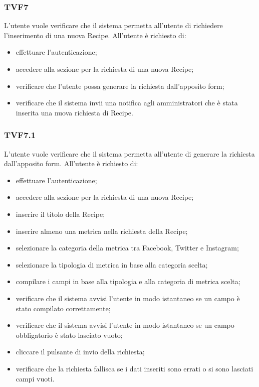 		\subsubsection{TVF7}
			L'utente vuole verificare che il sistema permetta all'utente di richiedere l'inserimento di una nuova Recipe. All'utente è richiesto di:
			\begin{itemize}
				\item effettuare l'autenticazione;
				\item accedere alla sezione per la richiesta di una nuova Recipe;
				\item verificare che l'utente possa generare la richiesta dall'apposito form;
				\item verificare che il sistema invii una notifica agli amministratori che è stata inserita  una nuova richiesta di Recipe.
			\end{itemize}
			
		\subsubsection{TVF7.1}
			L'utente vuole verificare che il sistema permetta all'utente di generare la richiesta dall'apposito form. All'utente è richiesto di:
			\begin{itemize}
				\item effettuare l'autenticazione;
				\item accedere alla sezione per la richiesta di una nuova Recipe;
				\item inserire il titolo della Recipe;
				\item inserire almeno una metrica nella richiesta della Recipe;
				\item selezionare la categoria della metrica tra Facebook, Twitter e Instagram;
				\item selezionare la tipologia di metrica in base alla categoria scelta;
				\item compilare i campi in base alla tipologia e alla categoria di metrica scelta;
				\item verificare che il sistema avvisi l'utente in modo istantaneo se un campo è stato compilato correttamente;
				\item verificare che il sistema avvisi l'utente in modo istantaneo se un campo obbligatorio è stato lasciato vuoto;
				\item cliccare il pulsante di invio della richiesta;
				\item verificare che la richiesta fallisca se i dati inseriti sono errati o si sono lasciati campi vuoti.
			\end{itemize}
			
